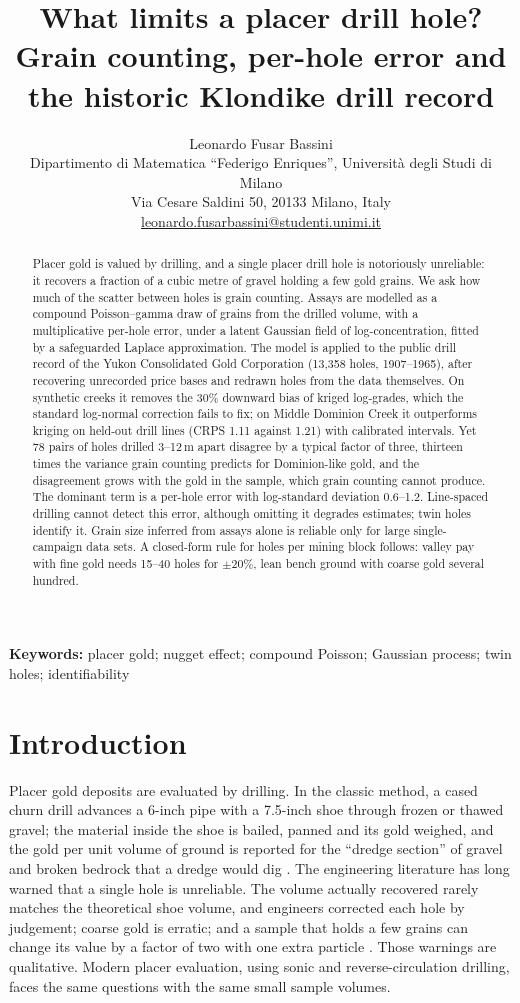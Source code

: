 \documentclass[11pt,a4paper]{article}
\title{What limits a placer drill hole? Grain counting, per-hole error and the historic Klondike drill record}
\author{Leonardo Fusar Bassini\\[4pt]
\small Dipartimento di Matematica ``Federigo Enriques'', Universit\`a degli Studi di Milano\\
\small Via Cesare Saldini 50, 20133 Milano, Italy\\
\small \href{mailto:leonardo.fusarbassini@studenti.unimi.it}{leonardo.fusarbassini@studenti.unimi.it}}
\date{}
\theoremstyle{remark}
\begin{document}
\maketitle

\begin{abstract}
\noindent
Placer gold is valued by drilling, and a single placer drill hole is notoriously unreliable: it recovers a fraction of a cubic metre of gravel holding a few gold grains. We ask how much of the scatter between holes is grain counting. Assays are modelled as a compound Poisson--gamma draw of grains from the drilled volume, with a multiplicative per-hole error, under a latent Gaussian field of log-concentration, fitted by a safeguarded Laplace approximation. The model is applied to the public drill record of the Yukon Consolidated Gold Corporation (13,358 holes, 1907--1965), after recovering unrecorded price bases and redrawn holes from the data themselves. On synthetic creeks it removes the 30\% downward bias of kriged log-grades, which the standard log-normal correction fails to fix; on Middle Dominion Creek it outperforms kriging on held-out drill lines (CRPS 1.11 against 1.21) with calibrated intervals. Yet 78 pairs of holes drilled 3--12\,m apart disagree by a typical factor of three, thirteen times the variance grain counting predicts for Dominion-like gold, and the disagreement grows with the gold in the sample, which grain counting cannot produce. The dominant term is a per-hole error with log-standard deviation 0.6--1.2. Line-spaced drilling cannot detect this error, although omitting it degrades estimates; twin holes identify it. Grain size inferred from assays alone is reliable only for large single-campaign data sets. A closed-form rule for holes per mining block follows: valley pay with fine gold needs 15--40 holes for $\pm 20\%$, lean bench ground with coarse gold several hundred.
\end{abstract}

\noindent\textbf{Keywords:} placer gold; nugget effect; compound Poisson; Gaussian process; twin holes; identifiability

\section{Introduction}

Placer gold deposits are evaluated by drilling. In the classic method, a cased churn drill advances a 6-inch pipe with a 7.5-inch shoe through frozen or thawed gravel; the material inside the shoe is bailed, panned and its gold weighed, and the gold per unit volume of ground is reported for the ``dredge section'' of gravel and broken bedrock that a dredge would dig \citep{Wells1969}. The engineering literature has long warned that a single hole is unreliable. The volume actually recovered rarely matches the theoretical shoe volume, and engineers corrected each hole by judgement; coarse gold is erratic; and a sample that holds a few grains can change its value by a factor of two with one extra particle \citep{Wells1969,Clifton1969}. Those warnings are qualitative. Modern placer evaluation, using sonic and reverse-circulation drilling, faces the same questions with the same small sample volumes.
\end{document}
